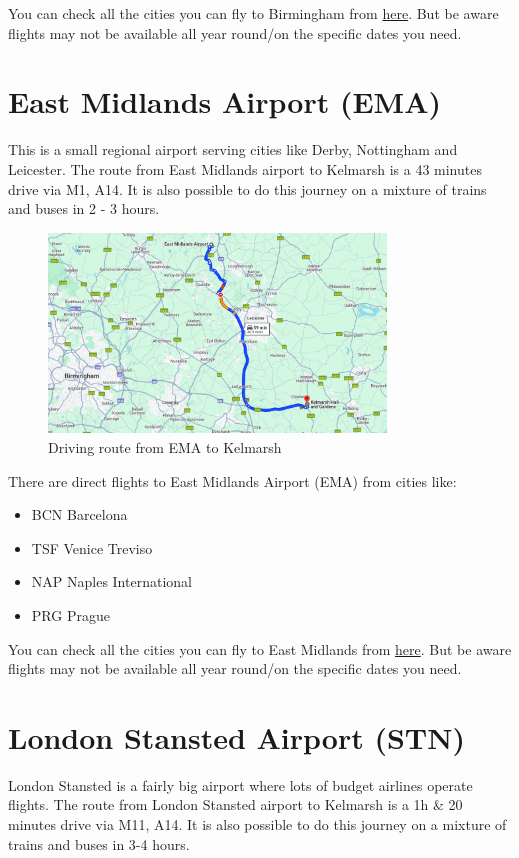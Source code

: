 \documentclass[a4paper, 11pt]{article}
\begin{document}
You can check all the cities you can fly to Birmingham from \href{https://www.birminghamairport.co.uk/destinations-and-more/where-we-fly/}{here}. But be aware flights may not be available all year round/on the specific dates you need.

\section{East Midlands Airport (EMA)}
This is a small regional airport serving cities like Derby, Nottingham and Leicester. The route from East Midlands airport to Kelmarsh is a 43 minutes drive via M1, A14. It is also possible to do this journey on a mixture of trains and buses in 2 - 3 hours.

\begin{figure}[H]
    \centering
    \includegraphics[width=0.8\textwidth]{assets/ema.png}
    \caption{Driving route from EMA to Kelmarsh}
\end{figure}

There are direct flights to East Midlands Airport (EMA) from cities like:
\begin{multicols}{2}
    \begin{itemize}
        \item BCN Barcelona 
        \item TSF Venice Treviso
        \item NAP Naples International
        \item PRG Prague
    \end{itemize}
\end{multicols}

You can check all the cities you can fly to East Midlands from \href{https://www.eastmidlandsairport.com/destinations-and-guides/a-z-list-of-destinations/}{here}. But be aware flights may not be available all year round/on the specific dates you need.

\section{London Stansted Airport (STN)}
London Stansted is a fairly big airport where lots of budget airlines operate flights. The route from London Stansted airport to Kelmarsh is a 1h \& 20 minutes drive via M11, A14. It is also possible to do this journey on a mixture of trains and buses in 3-4 hours. 
\end{document}
